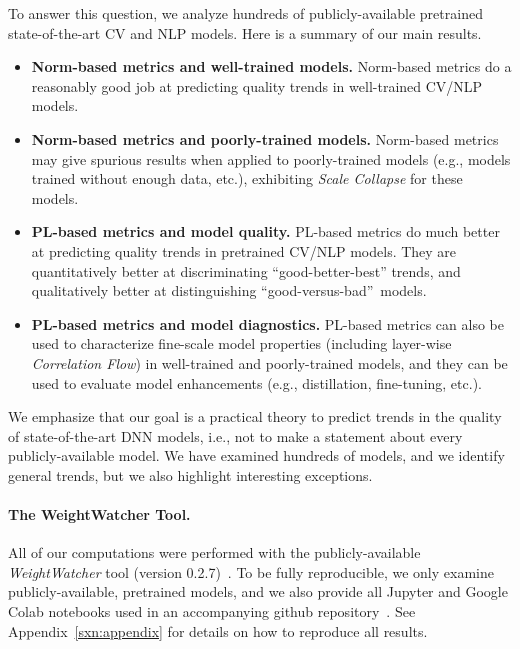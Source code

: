 To answer this question, we analyze hundreds of publicly-available pretrained state-of-the-art CV and NLP models. 
Here is a summary of our main results.
\begin{itemize}
\item
\textbf{Norm-based metrics and well-trained models.}
Norm-based metrics do a reasonably good job at predicting quality trends in well-trained CV/NLP models.
\item
\textbf{Norm-based metrics and poorly-trained models.}
Norm-based metrics may give spurious results when applied to poorly-trained models (e.g., models trained without enough data, etc.), exhibiting \emph{Scale Collapse} for these models. 
\item 
\textbf{PL-based metrics and model quality.}
PL-based metrics do much better at predicting quality trends in pretrained CV/NLP models.  
They are quantitatively better at discriminating ``good-better-best'' trends, and qualitatively better at distinguishing ``good-versus-bad''~models.
\item 
\textbf{PL-based metrics and model diagnostics.}
PL-based metrics can also be used to characterize fine-scale model properties (including layer-wise \emph{Correlation Flow}) in well-trained and poorly-trained models, and they can be used to evaluate model enhancements (e.g., distillation, fine-tuning, etc.).
\end{itemize}

\noindent
We emphasize that our goal is a practical theory to predict trends in the quality of state-of-the-art DNN models, i.e., not to make a statement about every publicly-available model.
We have examined hundreds of models, and we identify general trends, but we also highlight interesting exceptions.


\paragraph{The WeightWatcher Tool.}

All of our computations were performed with the publicly-available \emph{WeightWatcher} tool (version 0.2.7)~\cite{weightwatcher_package}.
To be fully reproducible, we only examine publicly-available, pretrained models, and we also provide all Jupyter and Google Colab notebooks used in an accompanying github repository~\cite{kdd20_sub_repo}.
See Appendix~\ref{sxn:appendix} for details on how to reproduce all results.


